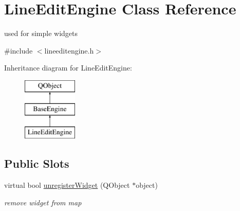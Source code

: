 \hypertarget{class_line_edit_engine}{}\section{Line\+Edit\+Engine Class Reference}
\label{class_line_edit_engine}


used for simple widgets  




{\ttfamily \#include $<$lineeditengine.\+h$>$}

Inheritance diagram for Line\+Edit\+Engine\+:\begin{figure}[H]
\begin{center}
\leavevmode
\includegraphics[height=3.000000cm]{class_line_edit_engine}
\end{center}
\end{figure}
\subsection*{Public Slots}
\begin{DoxyCompactItemize}
\item 
\mbox{\label{class_line_edit_engine_a51c432794123a1ea311ba5dd3d629c61}} 
virtual bool \hyperlink{class_line_edit_engine_a51c432794123a1ea311ba5dd3d629c61}{unregister\+Widget} (Q\+Object $\ast$object)
\begin{DoxyCompactList}\small\item\em remove widget from map \end{DoxyCompactList}\end{DoxyCompactItemize}
